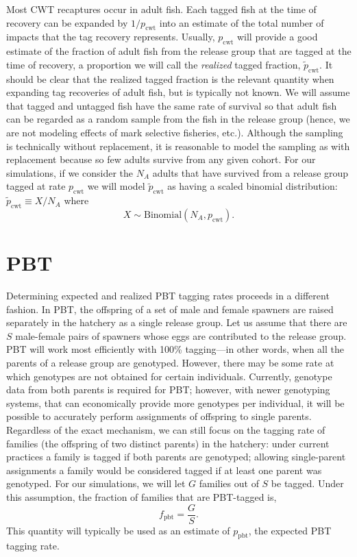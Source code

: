 \documentclass[11pt]{article}
\begin{document}
Most CWT recaptures occur in adult fish.  Each tagged fish at the time of recovery can be
expanded by $1/p_\mathrm{cwt}$ into an estimate of the total number of impacts that the tag recovery represents.
Usually, $p_\mathrm{cwt}$ will provide a good estimate of the fraction of adult fish from the release group
that are tagged at the time of recovery, a proportion we will call the {\em realized} tagged
fraction, $\tilde{p}_\mathrm{cwt}$.  It should be clear that the realized
tagged fraction is the relevant quantity when expanding
tag recoveries of adult fish, but is typically not known.  
We will assume that tagged and untagged fish have the same rate of
survival so that adult fish can be regarded as a random sample from the fish in the release group (hence,
we are not modeling
effects of mark selective fisheries, etc.).
Although the sampling is technically without replacement, it is reasonable to model the sampling as
with replacement because so few adults survive from any given cohort.  For our simulations, if we consider the
$N_A$ adults that have survived from a release group tagged at rate $p_\mathrm{cwt}$  we will
model $\tilde{p}_\mathrm{cwt}$ as having a scaled binomial distribution:
$	\tilde{p}_\mathrm{cwt} \equiv X/N_A$ where 
\[
X \sim \mathrm{Binomial}(N_A, p_\mathrm{cwt}).
\]


\section{PBT}
Determining expected and realized PBT tagging rates proceeds in a different fashion.  In PBT, the
offspring of a set of male and female spawners are raised separately in the hatchery
as a single release group. Let us assume that there are $S$ male-female pairs of spawners
whose eggs are contributed to the release group.  PBT will work most
efficiently with 100\% tagging---in other words, when all the parents of a release group
are genotyped.  However, there may be some rate at which genotypes are not obtained for certain
individuals.  Currently,
genotype data from both parents is  required for PBT; however, with newer genotyping
systems, that can economically provide more genotypes per individual, it will be possible
to accurately perform assignments of offspring to single parents.  Regardless of the exact mechanism,
we can still focus on the tagging rate of families (the offspring of two distinct parents) in the hatchery: under current practices
a family is tagged if both parents are genotyped; allowing single-parent assignments a family would be
considered tagged if at least one parent was genotyped.  For our 
simulations, we will let $G$ families out of $S$ be tagged.
Under this assumption, the
fraction of families that are PBT-tagged is,
\[
f_\mathrm{pbt} = \frac{G}{S}.
\]   
This quantity will typically be used as an estimate of $p_\mathrm{pbt}$, the expected PBT tagging rate.
\end{document}
